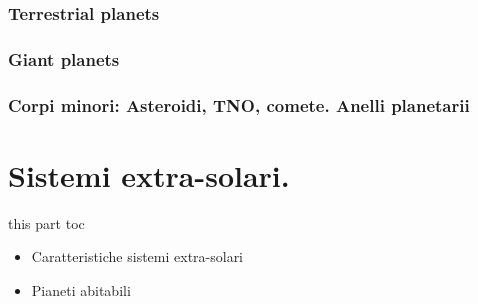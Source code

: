 \documentclass[10pt,xcolor={usenames},fleqn,mathserif,serif]{beamer}
\begin{document}
\section{Terrestrial planets}


\section{Giant planets}


\section{Corpi minori: Asteroidi, TNO, comete. Anelli planetarii}



\part{Sistemi extra-solari.}

\begin{frame}{this part toc}
\begin{itemize}
\item Caratteristiche sistemi extra-solari
\item Pianeti abitabili
\end{itemize}
\end{frame}



\clearpage

\end{document}
